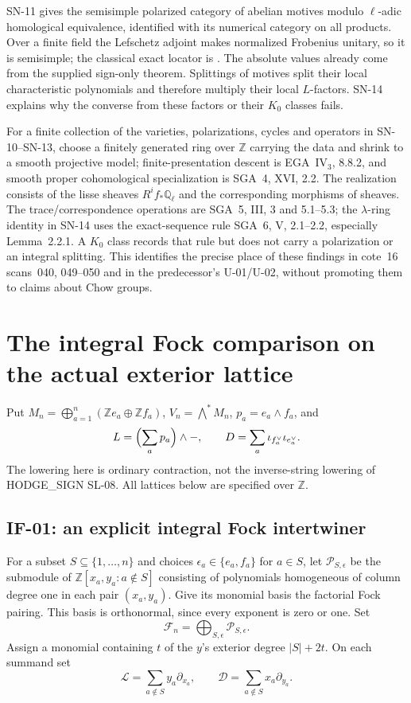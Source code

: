 \documentclass[11pt,a4paper]{article}
\theoremstyle{definition}
\theoremstyle{remark}
\begin{document}
SN-11 gives the semisimple polarized category of abelian motives modulo
$\ell$-adic homological equivalence, identified with its numerical
category on all products.  Over a finite field the Lefschetz adjoint makes
normalized Frobenius unitary, so it is semisimple; the classical exact
locator is \cite[Lemma~4.6 and Theorem~4.7]{Kleiman1968}.
The absolute values already come from the supplied sign-only theorem.
Splittings of motives split their local characteristic polynomials and
therefore multiply their local $L$-factors.  SN-14 explains why the
converse from these factors or their $K_0$ classes fails.

For a finite collection of the varieties, polarizations, cycles and
operators in SN-10--SN-13, choose a finitely generated ring over
$\mathbb Z$ carrying the data and shrink to a smooth projective model;
finite-presentation descent is EGA~IV$_3$, 8.8.2, and smooth proper
cohomological specialization is SGA~4, XVI, 2.2.
The realization consists of the lisse sheaves $R^i f_*\mathbb Q_\ell$ and
the corresponding morphisms of sheaves.  The trace/correspondence
operations are SGA~5, III, 3 and 5.1--5.3; the $\lambda$-ring identity in
SN-14 uses the exact-sequence rule SGA~6, V, 2.1--2.2, especially
Lemma~2.2.1.  A $K_0$ class
records that rule but does not carry a polarization or an integral
splitting.  This identifies the precise place of these findings in
cote~16 scans~040, 049--050 and in the predecessor's U-01/U-02, without
promoting them to claims about Chow groups.


\section{The integral Fock comparison on the actual exterior lattice}
\label{sec:integral-fock}

Put $M_n=\bigoplus_{a=1}^n(\mathbb Z e_a\oplus\mathbb Z f_a)$,
$V_n=\bigwedge^*M_n$, $p_a=e_a\wedge f_a$, and
\[
 L=\Bigl(\sum_a p_a\Bigr)\wedge-,\qquad
 D=\sum_a\iota_{f_a^\vee}\iota_{e_a^\vee}.
\]
The lowering here is ordinary contraction, not the inverse-string lowering
of HODGE\_SIGN SL-08. All lattices below are specified over $\mathbb Z$.

\subsection{IF-01: an explicit integral Fock intertwiner}
For a subset $S\subseteq\{1,\ldots,n\}$ and choices
$\epsilon_a\in\{e_a,f_a\}$ for $a\in S$, let
$\mathcal P_{S,\epsilon}$ be the submodule of
$\mathbb Z[x_a,y_a:a\notin S]$ consisting of polynomials homogeneous of
column degree one in each pair $(x_a,y_a)$. Give its monomial basis the
factorial Fock pairing. This basis is orthonormal, since every exponent is
zero or one. Set
\[
 \mathcal F_n=\bigoplus_{S,\epsilon}\mathcal P_{S,\epsilon}.
\]
Assign a monomial containing $t$ of the $y$'s exterior degree $|S|+2t$.
On each summand set
\[
 \mathscr L=\sum_{a\notin S}y_a\partial_{x_a},\qquad
 \mathscr D=\sum_{a\notin S}x_a\partial_{y_a}.
\]
\end{document}

